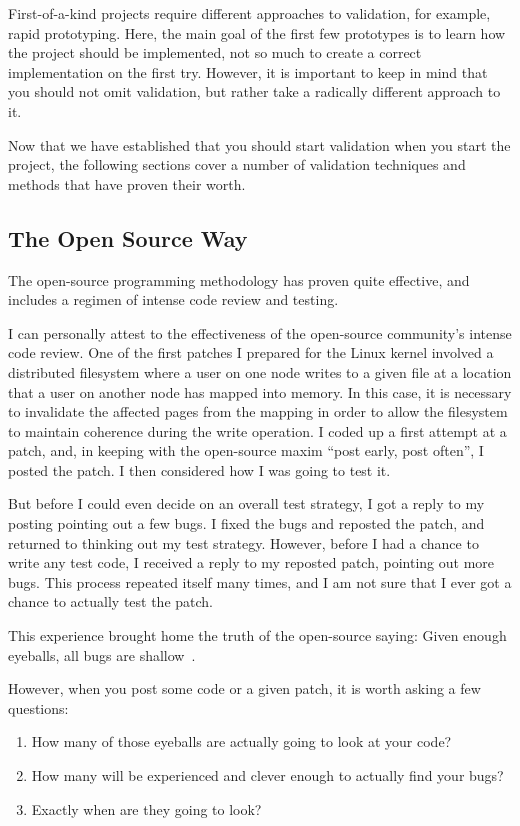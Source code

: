 First-of-a-kind projects
require different approaches to validation, for example,
rapid prototyping.
Here, the main goal of the first few prototypes is to learn how
the project should be implemented, not so much to create a correct
implementation on the first try.
However, it is important to keep in mind that you should not omit
validation, but rather take a radically different approach to it.

Now that we have established that you should start validation when you
start the project, the following sections cover a number of validation
techniques and methods that have proven their worth.

\subsection{The Open Source Way}
\label{sec:debugging:The Open Source Way}

The open-source programming methodology has proven quite effective, and
includes a regimen of intense code review and testing.

I can personally attest to the effectiveness of the open-source community's
intense code review.
One of the first patches I prepared for the Linux kernel involved
a distributed filesystem where a user on one node writes to a given
file at a location that a user on another node has mapped into memory.
In this case, it is necessary to invalidate the affected pages from
the mapping in order to allow the filesystem to maintain coherence
during the write operation.
I coded up a first attempt at a patch, and, in keeping with the open-source
maxim ``post early, post often'', I posted the patch.
I then considered how I was going to test it.

But before I could even decide on an overall test strategy, I got a
reply to my posting pointing out a few bugs.
I fixed the bugs and reposted the patch, and returned to thinking
out my test strategy.
However, before I had a chance to write any test code, I received
a reply to my reposted patch, pointing out more bugs.
This process repeated itself many times, and I am not sure that I
ever got a chance to actually test the patch.

This experience brought home the truth of the open-source saying:
Given enough eyeballs, all bugs are shallow~\cite{EricSRaymond99b}.

However, when you post some code or a given patch, it is worth
asking a few questions:

\begin{enumerate}
\item	How many of those eyeballs are actually going to look at your code?
\item	How many will be experienced and clever enough to actually find
	your bugs?
\item	Exactly when are they going to look?
\end{enumerate}


